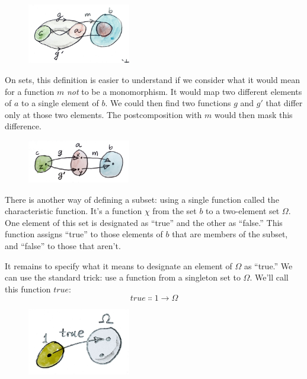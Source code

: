 \begin{figure}[H]
  \centering
  \includegraphics[width=0.4\textwidth]{images/monomorphism.jpg}
\end{figure}

\noindent
On sets, this definition is easier to understand if we consider what it
would mean for a function $m$ \emph{not} to be a monomorphism. It
would map two different elements of $a$ to a single element of
$b$. We could then find two functions $g$ and
$g'$ that differ only at those two elements. The
postcomposition with $m$ would then mask this difference.

\begin{figure}[H]
  \centering
  \includegraphics[width=0.4\textwidth]{images/notmono.jpg}
\end{figure}

\noindent
There is another way of defining a subset: using a single function
called the characteristic function. It's a function $\chi$ from the
set $b$ to a two-element set $\Omega$. One element of this set
is designated as ``true'' and the other as ``false.'' This function
assigns ``true'' to those elements of $b$ that are members of the
subset, and ``false'' to those that aren't.

It remains to specify what it means to designate an element of
$\Omega$ as ``true.'' We can use the standard trick: use a function
from a singleton set to $\Omega$. We'll call this function
$\mathit{true}$:
\[\mathit{true} \Colon 1 \to \Omega\]

\begin{figure}[H]
  \centering
  \includegraphics[width=0.4\textwidth]{images/true.jpg}
\end{figure}

